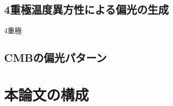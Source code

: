 \documentclass[../../main.tex]{subfiles}
\begin{document}
\subsection{4重極温度異方性による偏光の生成}
4重極

\subsection{CMBの偏光パターン}

\section{本論文の構成}
\end{document}
